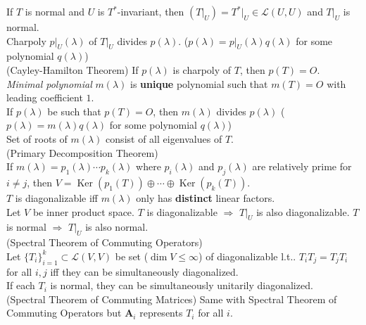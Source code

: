 \documentclass{article}
\theoremstyle{definition}
\DeclareMathOperator{\Ker}{Ker}
\begin{document}
If $T$ is normal and 
$U$ is $T^{*}$-invariant, then $(T\vert_{U})=T^{*}\vert_{U}\in\mathscr{L}(U,U)$ and $T\vert_{U}$ is normal.\\
Charpoly $p\vert_{U}(\lambda)$ of $T\vert_{U}$ divides $p(\lambda)$. ($p(\lambda)=p\vert_{U}(\lambda)q(\lambda)$ for some polynomial $q(\lambda)$)\\
(Cayley-Hamilton Theorem) If $p(\lambda)$ is charpoly of $T$, then $p(T)=O$.\\
\textit{Minimal polynomial} $m(\lambda)$ is \textbf{unique} polynomial such that $m(T)=O$ with leading coefficient $1$.\\
If $p(\lambda)$ be such that $p(T)=O$, then $m(\lambda)$ divides $p(\lambda)$ ($p(\lambda)=m(\lambda)q(\lambda)$ for some polynomial $q(\lambda)$)\\
Set of roots of $m(\lambda)$ consist of all eigenvalues of $T$.\\
(Primary Decomposition Theorem)\\
If $m(\lambda)=p_{1}(\lambda)\cdots p_{k}(\lambda)$ where $p_{i}(\lambda)$ and $p_{j}(\lambda)$ are relatively prime for $i\neq j$, then $V=\Ker(p_{1}(T))\oplus\cdots\oplus\Ker(p_{k}(T))$.\\
$T$ is diagonalizable iff $m(\lambda)$ only has \textbf{distinct} linear factors.\\
Let $V$ be inner product space. $T$ is diagonalizable $\Longrightarrow$ $T\vert_{U}$ is also diagonalizable. $T$ is normal $\Longrightarrow$ $T\vert_{U}$ is also normal.\\
(Spectral Theorem of Commuting Operators)\\
Let $\{T_{i}\}_{i=1}^{k}\subset\mathscr{L}(V,V)$ be set ($\dim V\leq\infty$) of diagonalizable l.t.. $T_{i}T_{j}=T_{j}T_{i}$ for all $i,j$ iff they can be simultaneously diagonalized.\\
If each $T_{i}$ is normal, they can be simultaneously unitarily diagonalized.\\
(Spectral Theorem of Commuting Matrices) Same with Spectral Theorem of Commuting Operators but $\mathbf{A}_{i}$ represents $T_{i}$ for all $i$.
\newpage
\end{document}
